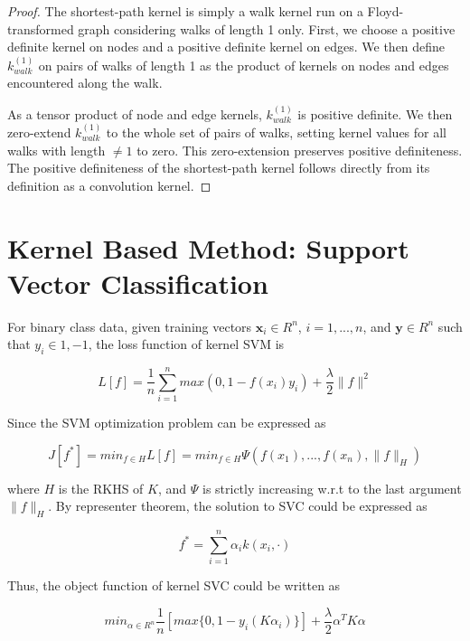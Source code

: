 \documentclass{llncs}
\begin{document}
\begin{proof}
The shortest-path kernel is simply a walk kernel run on a Floyd-transformed graph considering walks of length 1 only. First, we choose a positive definite kernel on nodes and a positive definite kernel on edges. We then define $k_{walk}^{(1)}$ on pairs of walks of length 1 as the product of kernels on nodes and edges encountered along the walk.

As a tensor product of node and edge kernels, $k_{walk}^{(1)}$ is positive definite. We then zero-extend $k_{walk}^{(1)}$ to the whole set of pairs of walks, setting kernel values for all walks with length $\neq 1$ to zero. This zero-extension preserves positive definiteness. The positive definiteness of the shortest-path kernel follows directly from its definition as a convolution kernel.
\end{proof}
%
\section{Kernel Based Method: Support Vector Classification}
%
For binary class data, given training vectors $\boldsymbol{x}_i \in R^n$, $i = 1,..., n$, and $\boldsymbol{y} \in R^n$ such that $y_i \in {1, -1}$, the loss function of kernel SVM is  

\begin{equation}
L[f]= \frac{1}{n} \sum_{i=1}^n max(0, 1 - f(x_i)y_i) + \frac{\lambda}{2} \|f\|^2 
\end{equation}

Since the SVM optimization problem can be expressed as  

\begin{equation}
J[f^*] = min_{f\in H} L[f] = min_{f \in H} \Psi(f(x_1), ..., f(x_n), \|f\|_H)
\end{equation}

where $H$ is the RKHS of $K$, and $\Psi$ is strictly increasing w.r.t to the last argument $\|f\|_H$. By representer theorem, the solution to SVC could be expressed as  

\begin{equation}
f^* = \sum_{i=1}^n \alpha_i k(x_i, \cdot)
\end{equation}

Thus, the object function of kernel SVC could be written as 

\begin{equation}
min_{\alpha \in R^n} \frac{1}{n}[max\{0, 1 - y_i (K\alpha_i)\}] + \frac{\lambda}{2} \alpha^T K \alpha
\end{equation}
\end{document}
